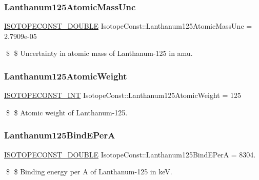 \subsubsection{\texorpdfstring{Lanthanum125\+Atomic\+Mass\+Unc}{Lanthanum125AtomicMassUnc}}
{\footnotesize\ttfamily \mbox{\hyperlink{group___isotope_const-_macros_ga8f45a7272ce02c0b4c65c44636ed719a}{I\+S\+O\+T\+O\+P\+E\+C\+O\+N\+S\+T\+\_\+\+D\+O\+U\+B\+LE}} Isotope\+Const\+::\+Lanthanum125\+Atomic\+Mass\+Unc = 2.\+7909e-\/05}

\$ \$ Uncertainty in atomic mass of Lanthanum-\/125 in amu. \mbox{\label{group___isotope_const-_lanthanum-_la125_gaaacd1e858988d7830aee5fb45f396e09}} 
\subsubsection{\texorpdfstring{Lanthanum125\+Atomic\+Weight}{Lanthanum125AtomicWeight}}
{\footnotesize\ttfamily \mbox{\hyperlink{group___isotope_const-_macros_ga5f18360b3e99483a35c32d789e62621c}{I\+S\+O\+T\+O\+P\+E\+C\+O\+N\+S\+T\+\_\+\+I\+NT}} Isotope\+Const\+::\+Lanthanum125\+Atomic\+Weight = 125}

\$ \$ Atomic weight of Lanthanum-\/125. \mbox{\label{group___isotope_const-_lanthanum-_la125_gaa007c19e50b8d0cc7828b0916840bb9f}} 
\subsubsection{\texorpdfstring{Lanthanum125\+Bind\+E\+PerA}{Lanthanum125BindEPerA}}
{\footnotesize\ttfamily \mbox{\hyperlink{group___isotope_const-_macros_ga8f45a7272ce02c0b4c65c44636ed719a}{I\+S\+O\+T\+O\+P\+E\+C\+O\+N\+S\+T\+\_\+\+D\+O\+U\+B\+LE}} Isotope\+Const\+::\+Lanthanum125\+Bind\+E\+PerA = 8304.}

\$ \$ Binding energy per A of Lanthanum-\/125 in keV. \mbox{\label{group___isotope_const-_lanthanum-_la125_ga7e39885b75e8a5f55f5e52173b19de16}} 
